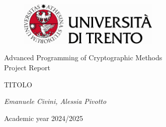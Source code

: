 \pagestyle{plain}
\thispagestyle{empty}

  \vspace*{\fill}

  \begin{center}
  \begin{figure}[h!]
    \centering
    \includegraphics[keepaspectratio, width=0.6\textwidth]{Pic/marchio_unitrento_colore_it_202002.eps}
  \end{figure}

  \vspace{2 cm} 

  \LARGE{Advanced Programming of Cryptographic Methods}\\

  \vspace{1 cm} 
  \Large{Project Report}

  \vspace{2 cm} 

  \Huge\textsc{TITOLO}

    \vspace{2 cm} 
 
  \Large{\it{ Emanuele Civini, Alessia Pivotto }}

  \vspace{2 cm} 

  \Large{Academic year 2024/2025}
  \vspace*{\fill}
\end{center}
